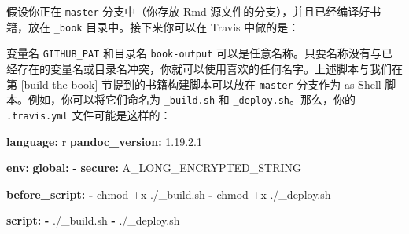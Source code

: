 \documentclass[
  12pt,
]{krantz}
\newenvironment{Shaded}{\begin{snugshade}}{\end{snugshade}}
\newcommand{\AttributeTok}[1]{\textcolor[rgb]{0.13,0.29,0.53}{#1}}
\newcommand{\BuiltInTok}[1]{#1}
\newcommand{\CommentTok}[1]{\textcolor[rgb]{0.56,0.35,0.01}{\textit{#1}}}
\newcommand{\DataTypeTok}[1]{\textcolor[rgb]{0.13,0.29,0.53}{#1}}
\newcommand{\FloatTok}[1]{\textcolor[rgb]{0.00,0.00,0.81}{#1}}
\newcommand{\FunctionTok}[1]{\textcolor[rgb]{0.13,0.29,0.53}{\textbf{#1}}}
\newcommand{\KeywordTok}[1]{\textcolor[rgb]{0.13,0.29,0.53}{\textbf{#1}}}
\newcommand{\NormalTok}[1]{#1}
\newcommand{\PreprocessorTok}[1]{\textcolor[rgb]{0.56,0.35,0.01}{\textit{#1}}}
\newcommand{\StringTok}[1]{\textcolor[rgb]{0.31,0.60,0.02}{#1}}
\newcommand{\VariableTok}[1]{\textcolor[rgb]{0.00,0.00,0.00}{#1}}
\theoremstyle{definition}
\theoremstyle{definition}
\theoremstyle{definition}
\theoremstyle{definition}
\theoremstyle{remark}
\begin{document}
假设你正在 \texttt{master} 分支中（你存放 Rmd 源文件的分支），并且已经编译好书籍，放在 \texttt{\_book} 目录中。接下来你可以在 Travis 中做的是：

\begin{Shaded}
\end{Shaded}

变量名 \texttt{GITHUB\_PAT} 和目录名 \texttt{book-output} 可以是任意名称。只要名称没有与已经存在的变量名或目录名冲突，你就可以使用喜欢的任何名字。上述脚本与我们在第 \ref{build-the-book} 节提到的书籍构建脚本可以放在 \texttt{master} 分支作为 as Shell 脚本。例如，你可以将它们命名为 \texttt{\_build.sh} 和 \texttt{\_deploy.sh}。那么，你的 \texttt{.travis.yml} 文件可能是这样的：

\begin{Shaded}
\begin{Highlighting}[]
\FunctionTok{language}\KeywordTok{:}\AttributeTok{ r}
\FunctionTok{pandoc\_version}\KeywordTok{:}\AttributeTok{ }\FloatTok{1.19.2.1}

\FunctionTok{env}\KeywordTok{:}
\AttributeTok{  }\FunctionTok{global}\KeywordTok{:}
\AttributeTok{    }\KeywordTok{{-}}\AttributeTok{ }\FunctionTok{secure}\KeywordTok{:}\AttributeTok{ A\_LONG\_ENCRYPTED\_STRING}

\FunctionTok{before\_script}\KeywordTok{:}
\AttributeTok{  }\KeywordTok{{-}}\AttributeTok{ chmod +x ./\_build.sh}
\AttributeTok{  }\KeywordTok{{-}}\AttributeTok{ chmod +x ./\_deploy.sh}

\FunctionTok{script}\KeywordTok{:}
\AttributeTok{  }\KeywordTok{{-}}\AttributeTok{ ./\_build.sh}
\AttributeTok{  }\KeywordTok{{-}}\AttributeTok{ ./\_deploy.sh}
\end{Highlighting}
\end{Shaded}
\end{document}
